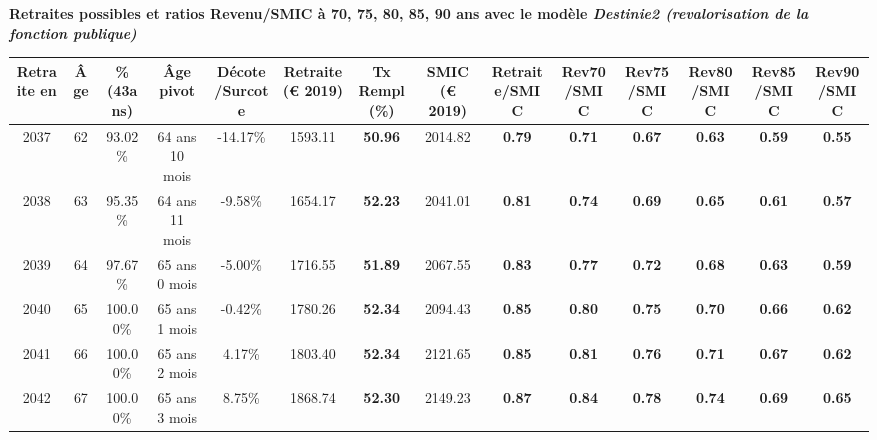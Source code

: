 \vspace{0.1cm} 
{\bf \noindent Retraites possibles et ratios Revenu/SMIC à 70, 75, 80, 85, 90 ans avec le modèle \emph{Destinie2 (revalorisation de la fonction publique)}}  
 
\begin{adjustbox}{max width=\textwidth} 
\begin{tabular}[htb]{|c|c||c|c|c||c|c||c||c|c|c|c|c|c|} 
\hline 
 Retraite en &  Âge &  \%(43ans) &  Âge pivot &  Décote/Surcote &  Retraite (\euro{} 2019) &  Tx Rempl(\%) &  SMIC (\euro{} 2019) &  Retraite/SMIC &  Rev70/SMIC &  Rev75/SMIC &  Rev80/SMIC &  Rev85/SMIC &  Rev90/SMIC \\ 
\hline \hline 
 2037 &  62 &  93.02\% &  64 ans 10 mois &  -14.17\% &  1593.11 &  {\bf 50.96} &  2014.82 &  {\bf {\color{red} 0.79}} &  {\bf {\color{red} 0.71}} &  {\bf {\color{red} 0.67}} &  {\bf {\color{red} 0.63}} &  {\bf {\color{red} 0.59}} &  {\bf {\color{red} 0.55}} \\ 
\hline 
 2038 &  63 &  95.35\% &  64 ans 11 mois &  -9.58\% &  1654.17 &  {\bf 52.23} &  2041.01 &  {\bf {\color{red} 0.81}} &  {\bf {\color{red} 0.74}} &  {\bf {\color{red} 0.69}} &  {\bf {\color{red} 0.65}} &  {\bf {\color{red} 0.61}} &  {\bf {\color{red} 0.57}} \\ 
\hline 
 2039 &  64 &  97.67\% &  65 ans 0 mois &  -5.00\% &  1716.55 &  {\bf 51.89} &  2067.55 &  {\bf {\color{red} 0.83}} &  {\bf {\color{red} 0.77}} &  {\bf {\color{red} 0.72}} &  {\bf {\color{red} 0.68}} &  {\bf {\color{red} 0.63}} &  {\bf {\color{red} 0.59}} \\ 
\hline 
 2040 &  65 &  100.00\% &  65 ans 1 mois &  -0.42\% &  1780.26 &  {\bf 52.34} &  2094.43 &  {\bf {\color{red} 0.85}} &  {\bf {\color{red} 0.80}} &  {\bf {\color{red} 0.75}} &  {\bf {\color{red} 0.70}} &  {\bf {\color{red} 0.66}} &  {\bf {\color{red} 0.62}} \\ 
\hline 
 2041 &  66 &  100.00\% &  65 ans 2 mois &  4.17\% &  1803.40 &  {\bf 52.34} &  2121.65 &  {\bf {\color{red} 0.85}} &  {\bf {\color{red} 0.81}} &  {\bf {\color{red} 0.76}} &  {\bf {\color{red} 0.71}} &  {\bf {\color{red} 0.67}} &  {\bf {\color{red} 0.62}} \\ 
\hline 
 2042 &  67 &  100.00\% &  65 ans 3 mois &  8.75\% &  1868.74 &  {\bf 52.30} &  2149.23 &  {\bf {\color{red} 0.87}} &  {\bf {\color{red} 0.84}} &  {\bf {\color{red} 0.78}} &  {\bf {\color{red} 0.74}} &  {\bf {\color{red} 0.69}} &  {\bf {\color{red} 0.65}} \\ 
\hline 
\hline 
\end{tabular} 
\end{adjustbox} 
 
